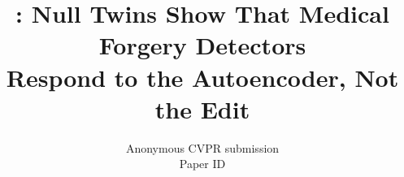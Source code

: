 \documentclass[10pt,twocolumn,letterpaper]{article}
\title{\dataset: Null Twins Show That Medical Forgery Detectors\\Respond to the Autoencoder, Not the Edit}
\author{Anonymous CVPR submission\\
Paper ID \paperID}
\begin{document}
\maketitle








{
    \small
    
    
}

% 
\end{document}
